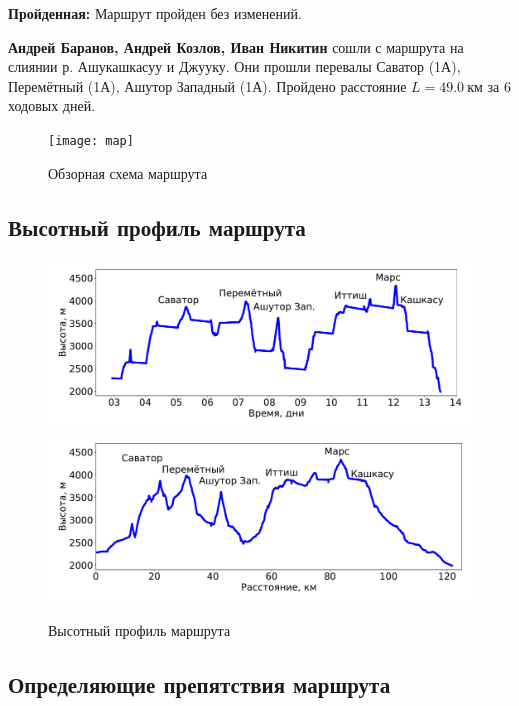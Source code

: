 \textbf{Пройденная:} Маршрут пройден без изменений.

\textbf{Андрей Баранов, Андрей Козлов, Иван Никитин} сошли с маршрута на слиянии р. Ашукашкасуу и Джууку. Они прошли перевалы Саватор (1А), Перемётный (1А), Ашутор Западный (1А). Пройдено расстояние $L=49.0~\text{км}$ за 6 ходовых дней.

\begin{figure}[h!tbp]
	\centering
	\texttt{[image: map]}
	\caption{Обзорная схема маршрута}
\end{figure}

\newpage
\subsection{Высотный профиль маршрута}

\begin{figure}[h!]
	\centering
	\includegraphics[width=0.92\linewidth]{elevation_vs_time}
	\includegraphics[width=0.92\linewidth]{elevation_vs_distance}
	\caption{Высотный профиль маршрута}
	\label{fig:heights}
\end{figure}

\newpage
\subsection{Определяющие препятствия маршрута}

